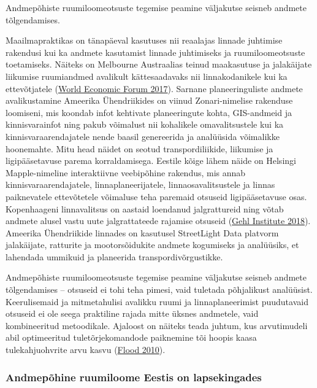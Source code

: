 \documentclass[estonian,]{article}
\begin{document}
\begin{blockquote-left}
Andmepõhiste ruumiloomeotsuste tegemise peamine väljakutse seisneb
andmete tõlgendamises.
\end{blockquote-left}

Maailmapraktikas on tänapäeval kasutuses nii reaalajas linnade juhtimise rakendusi kui ka andmete kasutamist linnade juhtimiseks ja ruumiloomeotsuste toetamiseks. Näiteks on Melbourne Austraalias teinud maakasutuse ja jalakäijate liikumise ruumiandmed avalikult kättesaadavaks nii linnakodanikele kui ka ettevõtjatele (\protect\hyperlink{World2017}{World Economic Forum 2017}). Sarnane planeeringuliste andmete avalikustamine Ameerika Ühendriikides on viinud Zonari-nimelise rakenduse loomiseni, mis koondab infot kehtivate planeeringute kohta, GIS-andmeid ja kinnisvarainfot ning pakub võimalust nii kohalikele omavalitsustele kui ka kinnisvaraarendajatele nende baasil genereerida ja analüüsida võimalikke hoonemahte. Mitu head näidet on seotud transpordiliikide, liikumise ja ligipääsetavuse parema korraldamisega. Eestile kõige lähem näide on Helsingi Mapple-nimeline interaktiivne veebipõhine rakendus, mis annab kinnisvaraarendajatele, linnaplaneerijatele, linnaosavalitsustele ja linnas paiknevatele ettevõtetele võimaluse teha paremaid otsuseid ligipääsetavuse osas. Kopenhaageni linnavalitsus on aastaid loendanud jalgrattureid ning võtab andmete alusel vastu uute jalgrattateede rajamise otsuseid (\protect\hyperlink{Gehl2018}{Gehl Institute 2018}). Ameerika Ühendriikide linnades on kasutusel StreetLight Data platvorm jalakäijate, ratturite ja mootorsõidukite andmete kogumiseks ja analüüsiks, et lahendada ummikuid ja planeerida transpordivõrgustikke.

Andmepõhiste ruumiloomeotsuste tegemise peamine väljakutse seisneb andmete tõlgendamises -- otsuseid ei tohi teha pimesi, vaid tuletada põhjalikust analüüsist. Keerulisemaid ja mitmetahulisi avalikku ruumi ja linnaplaneerimist puudutavaid otsuseid ei ole seega praktiline rajada mitte üksnes andmetele, vaid kombineeritud metoodikale. Ajaloost on näiteks teada juhtum, kus arvutimudeli abil optimeeritud tuletõrjekomandode paiknemine tõi hoopis kaasa tulekahjuohvrite arvu kasvu (\protect\hyperlink{Flood2010}{Flood 2010}).

\hypertarget{andmepuxf5hine-ruumiloome-eestis-on-lapsekingades}{%
\subsubsection*{Andmepõhine ruumiloome Eestis on lapsekingades}\label{andmepuxf5hine-ruumiloome-eestis-on-lapsekingades}}
\end{document}
